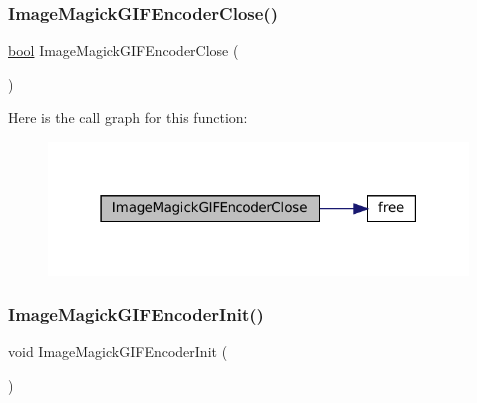 \subsubsection{\texorpdfstring{Image\+Magick\+G\+I\+F\+Encoder\+Close()}{ImageMagickGIFEncoderClose()}}
{\footnotesize\ttfamily \mbox{\hyperlink{libretro_8h_a4a26dcae73fb7e1528214a068aca317e}{bool}} Image\+Magick\+G\+I\+F\+Encoder\+Close (\begin{DoxyParamCaption}\item[{struct \mbox{\hyperlink{imagemagick-gif-encoder_8h_struct_image_magick_g_i_f_encoder}{Image\+Magick\+G\+I\+F\+Encoder}} $\ast$}]{ }\end{DoxyParamCaption})}

Here is the call graph for this function\+:
\nopagebreak
\begin{figure}[H]
\begin{center}
\leavevmode
\includegraphics[width=316pt]{imagemagick-gif-encoder_8h_a9bd69f1ac5e6c5edd3032e2bb25e35bf_cgraph}
\end{center}
\end{figure}
\mbox{\label{imagemagick-gif-encoder_8h_a4e6792b03fca56bec992859842ec4b58}} 
\subsubsection{\texorpdfstring{Image\+Magick\+G\+I\+F\+Encoder\+Init()}{ImageMagickGIFEncoderInit()}}
{\footnotesize\ttfamily void Image\+Magick\+G\+I\+F\+Encoder\+Init (\begin{DoxyParamCaption}\item[{struct \mbox{\hyperlink{imagemagick-gif-encoder_8h_struct_image_magick_g_i_f_encoder}{Image\+Magick\+G\+I\+F\+Encoder}} $\ast$}]{ }\end{DoxyParamCaption})}

